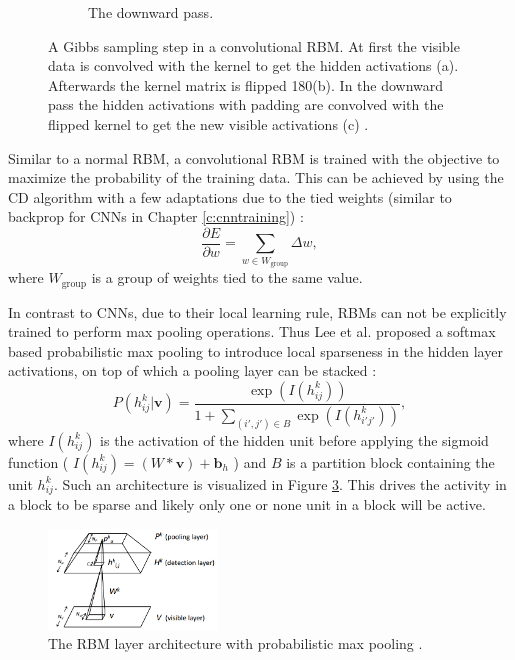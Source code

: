 \begin{figure}
\begin{subfigure}[t]{.30\textwidth}
  		\caption{The downward pass.}
  		\label{fig:convrbmsub3}
	\end{subfigure}
	\caption[A Gibbs sampling step in a convolutional RBM.]{A Gibbs sampling step in a convolutional RBM. At first the visible data is convolved with the kernel to get the hidden activations (a). Afterwards the kernel matrix is flipped 180\textdegree  (b). In the downward pass the hidden activations with padding are convolved with the flipped kernel to get the new visible activations (c) \cite{convImg}.}
	\label{fig:convrbm}
\end{figure}


Similar to a normal RBM, a convolutional RBM is trained with the objective to maximize the probability of the training data.
This can be achieved by using the CD algorithm with a few adaptations due to the tied weights (similar to backprop for CNNs in Chapter \ref{c:cnntraining}) \cite{NorouziM2009}: 
\[
\frac{\partial E}{\partial w} = \sum_{w \in W_{\text{group}}} \Delta w,
\]
where $W_{\text{group}}$ is a group of weights tied to the same value.

In contrast to CNNs, due to their local learning rule, RBMs can not be explicitly trained to perform max pooling operations.
Thus Lee et al. proposed a softmax based probabilistic max pooling to introduce local sparseness in the hidden layer activations, on top of which a pooling layer can be stacked \cite{lee2009convolutional}:
\[
P(h^k_{ij} | \textbf{v}) = \frac{\exp(I(h^k_{ij}))}{1 + \sum_{(i',j') \in B} \exp(I(h^k_{i'j'}))},
\]
where $I(h^k_{ij})$ is the activation of the hidden unit before applying the sigmoid function ( $I(h^k_{ij})=(W * \textbf{v}) + \textbf{b}_{h}$ ) and $B$ is a partition block containing the unit $h^k_{ij}$. 
Such an architecture is visualized in Figure \ref{fig:probmaxpool}.
This drives the activity in a block to be sparse and likely only one or none unit in a block will be active.

\begin{figure}[h!]
	\centering
    	\includegraphics[width=0.4\textwidth]{imgs/prob_max_pool.png} 
    \caption{The RBM layer architecture with probabilistic max pooling \cite{lee2009convolutional}.}
	\label{fig:probmaxpool}
\end{figure}


